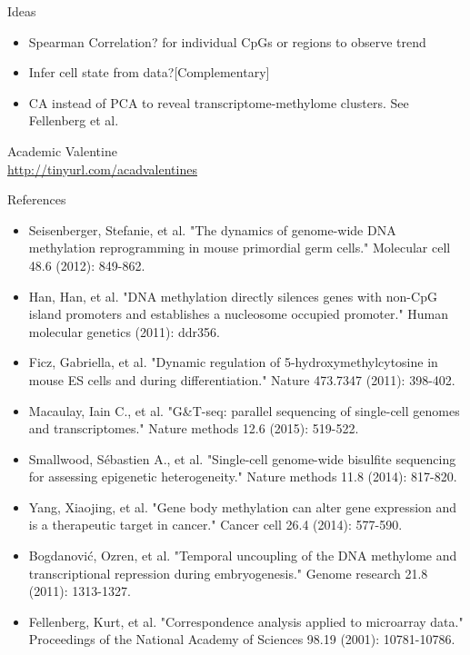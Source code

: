 \documentclass[10pt, compress]{beamer}
\renewcommand{\(}{\begin{columns}}
\renewcommand{\)}{\end{columns}}
\newcommand{\<}[1]{\begin{column}{#1}}
\renewcommand{\>}{\end{column}}
\begin{document}
\begin{frame}[fragile]
	\centering \Huge Ideas
	\Large \begin{itemize}
		\item Spearman Correlation? for individual CpGs or regions to observe trend
		\item Infer cell state from data?[Complementary]
		\item CA instead of PCA to reveal transcriptome-methylome clusters. See Fellenberg et al.
	\end{itemize}
\end{frame}


\begin{frame}[fragile]
	\begin{center} \Huge Academic Valentine\\
		\vspace*{20pt}
	\Large \color{blue}\underline{\url{http://tinyurl.com/acadvalentines}}
	\end{center}
\end{frame}

\begin{frame}[fragile]
	\centering \Large {References}
	\footnotesize
	\begin{itemize}
		\item Seisenberger, Stefanie, et al. "The dynamics of genome-wide DNA methylation reprogramming in mouse primordial germ cells." Molecular cell 48.6 (2012): 849-862.
		\item Han, Han, et al. "DNA methylation directly silences genes with non-CpG island promoters and establishes a nucleosome occupied promoter." Human molecular genetics (2011): ddr356.
		\item Ficz, Gabriella, et al. "Dynamic regulation of 5-hydroxymethylcytosine in mouse ES cells and during differentiation." Nature 473.7347 (2011): 398-402. 
		\item Macaulay, Iain C., et al. "G\&T-seq: parallel sequencing of single-cell genomes and transcriptomes." Nature methods 12.6 (2015): 519-522.
		\item Smallwood, Sébastien A., et al. "Single-cell genome-wide bisulfite sequencing for assessing epigenetic heterogeneity." Nature methods 11.8 (2014): 817-820.
		\item Yang, Xiaojing, et al. "Gene body methylation can alter gene expression and is a therapeutic target in cancer." Cancer cell 26.4 (2014): 577-590.
		\item Bogdanović, Ozren, et al. "Temporal uncoupling of the DNA methylome and transcriptional repression during embryogenesis." Genome research 21.8 (2011): 1313-1327.
		\item Fellenberg, Kurt, et al. "Correspondence analysis applied to microarray data." Proceedings of the National Academy of Sciences 98.19 (2001): 10781-10786.
	\end{itemize}
\end{frame}
\end{document}
